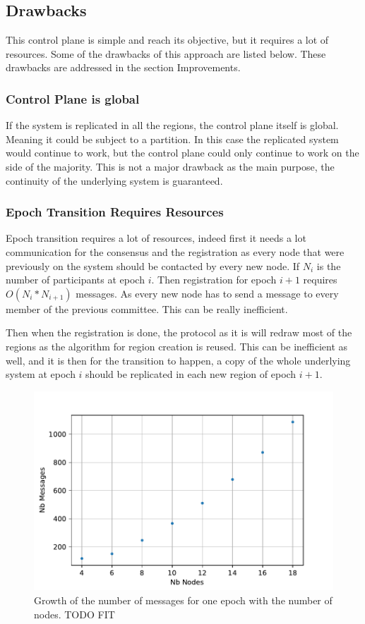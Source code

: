 \documentclass[a4paper,11pt,oneside]{report}
\begin{document}
\subsection{Drawbacks}
This control plane is simple and reach its objective, but it requires a lot of
resources. Some of the drawbacks of this approach are listed below. 
These drawbacks are addressed in the section Improvements.  

\subsubsection{Control Plane is global}
If the system is replicated in all the regions, the control plane itself is
global. Meaning it could be subject to a partition. In this case the replicated
system would continue to work, but the control plane could only continue to
work on the side of the majority. This is not a major drawback as the main
purpose, the continuity of the underlying system is guaranteed.

\subsubsection{Epoch Transition Requires Resources}
Epoch transition requires a lot of resources, indeed first it needs a lot
communication for the consensus and the registration as every node that were
previously on the system should be contacted by every new node. If $N_i$ is
the number of participants at epoch $i$. Then registration for epoch $i+1$
requires $O(N_i * N_{i+1})$ messages. As every new node has to send a message
to every member of the previous committee. This can be really inefficient. 

Then when the registration is done, the protocol as it is will redraw most of
the regions as the algorithm for region creation is reused. This can be
inefficient as well, and it is then for the transition to happen, a copy of the
whole underlying system at epoch $i$ should be replicated in each new region of
epoch $i+1$.

\begin{figure}[!h] 
\centering
\includegraphics[width=350pt]{figures/messages-plot}
\caption{Growth of the number of messages for one epoch with the number of nodes. \color{red} TODO FIT \color{black}}
\label{fig:messages-plot}
\end{figure}
\end{document}
